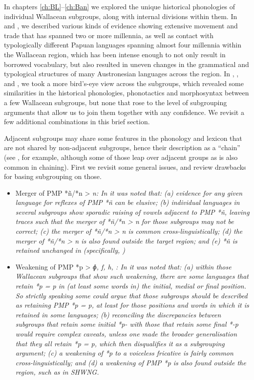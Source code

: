In chapters \ref{ch:BL}--\ref{ch:Ban} we explored the unique historical phonologies
of individual Wallacean subgroups,
along with internal divisions within them.
In  and , we described various kinds of
evidence showing extensive movement
and trade that has spanned two or more millennia,
as well as contact with typologically different Papuan languages
spanning almost four millennia within the Wallacean region,
which has been intense enough to not only result in borrowed
vocabulary, but also resulted in uneven changes in the grammatical
and typological structures of many Austronesian languages across the region.
In , , and , we took a more
bird’s-eye view across the subgroups,
which revealed some similarities in the historical phonologies,
phonotactics and morphosyntax between a few Wallacean subgroups,
but none that rose to the level of subgrouping arguments that
allow us to join them together with any confidence.
We revisit a few additional combinations in this brief section.

Adjacent subgroups may share some features in the phonology
and lexicon that are not shared by non-adjacent subgroups,
hence their description as a “chain” (see ,
for example, although some of those leap over adjacent groups
as is also common in chaining).
First we revisit some general issues,
and review drawbacks for basing subgrouping on those.

\begin{itemize}
	\item	Merger of PMP *ñ/*n > \it{n}: In  it was noted
				that: (a) evidence for any given language for reflexes of PMP
				*ñ can be elusive; (b) individual languages in several subgroups
				show sporadic raising of vowels adjacent to PMP *ñ,
				leaving traces such that the merger of *ñ/*n > \it{n} for those
				subgroups may not be correct; (c) the merger of *ñ/*n
				> \it{n} is common cross-linguistically; (d) the merger of *ñ/*n
				> \it{n} is also found outside the target region;
				and (e) *ñ is retained unchanged in  (specifically,
				) 
	\item	Weakening of PMP *p > \it{ɸ,
				f, h,} {\0}: In  it was noted that: (a) within
				those Wallacean subgroups that show such weakening,
				there are some languages that retain *p = \it{p} in (at least
				some words in) the initial,
				medial or final position.
				So strictly speaking some could argue that those subgroups should
				be described as retaining PMP *p = \it{p},
				at least for those positions
				and words in which it is retained in some languages; (b) reconciling
				the discrepancies between subgroups that retain some initial
				*p- with those that retain some final *-p would require complex
				caveats, unless one made the broader generalisation that they all retain
				*p = \it{p}, which then disqualifies it as a subgrouping argument; (c) a weakening
				of *p to a voiceless fricative is fairly common cross-linguistically;
				and (d) a weakening of PMP *p is also found outside the region,
				such as in SHWNG.
\end{itemize}

